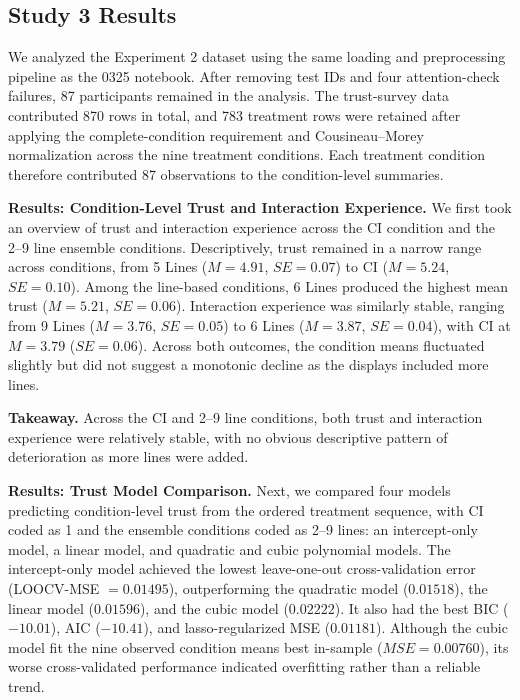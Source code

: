 \subsection{Study 3 Results}
We analyzed the Experiment 2 dataset using the same loading and preprocessing pipeline as the 0325 notebook. After removing test IDs and four attention-check failures, 87 participants remained in the analysis. The trust-survey data contributed 870 rows in total, and 783 treatment rows were retained after applying the complete-condition requirement and Cousineau--Morey normalization across the nine treatment conditions. Each treatment condition therefore contributed 87 observations to the condition-level summaries.

\noindent\textbf{Results: Condition-Level Trust and Interaction Experience.}
We first took an overview of trust and interaction experience across the CI condition and the 2--9 line ensemble conditions. Descriptively, trust remained in a narrow range across conditions, from 5 Lines ($M=4.91$, $SE=0.07$) to CI ($M=5.24$, $SE=0.10$). Among the line-based conditions, 6 Lines produced the highest mean trust ($M=5.21$, $SE=0.06$). Interaction experience was similarly stable, ranging from 9 Lines ($M=3.76$, $SE=0.05$) to 6 Lines ($M=3.87$, $SE=0.04$), with CI at $M=3.79$ ($SE=0.06$). Across both outcomes, the condition means fluctuated slightly but did not suggest a monotonic decline as the displays included more lines.

\noindent\textbf{Takeaway.}
Across the CI and 2--9 line conditions, both trust and interaction experience were relatively stable, with no obvious descriptive pattern of deterioration as more lines were added.

\noindent\textbf{Results: Trust Model Comparison.}
Next, we compared four models predicting condition-level trust from the ordered treatment sequence, with CI coded as 1 and the ensemble conditions coded as 2--9 lines: an intercept-only model, a linear model, and quadratic and cubic polynomial models. The intercept-only model achieved the lowest leave-one-out cross-validation error (LOOCV-MSE $=0.01495$), outperforming the quadratic model ($0.01518$), the linear model ($0.01596$), and the cubic model ($0.02222$). It also had the best BIC ($-10.01$), AIC ($-10.41$), and lasso-regularized MSE ($0.01181$). Although the cubic model fit the nine observed condition means best in-sample ($MSE=0.00760$), its worse cross-validated performance indicated overfitting rather than a reliable trend.

